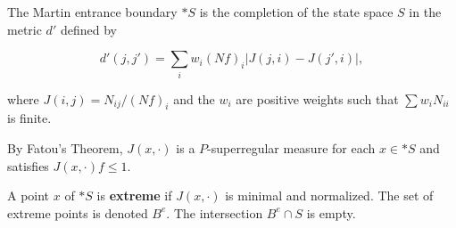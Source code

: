 The Martin entrance boundary $*S$ is the completion of the state space $S$ in the metric $d'$ defined by

$$d'(j,j') = \sum_i w_i (Nf)_{i} |J(j,i) - J(j',i)|,$$

where $J(i,j) = N_{ij}/(Nf)_i$ and the $w_i$ are positive weights such that $\sum w_i N_{ii}$ is finite.

By Fatou's Theorem, $J(x,\cdot)$ is a $P$-superregular measure for each $x \in *S$ and satisfies $J(x,\cdot)f \leq 1$.

A point $x$ of $*S$ is \textbf{extreme} if $J(x,\cdot)$ is minimal and normalized. The set of extreme points is denoted $B^e$. The intersection $B^e \cap S$ is empty.

